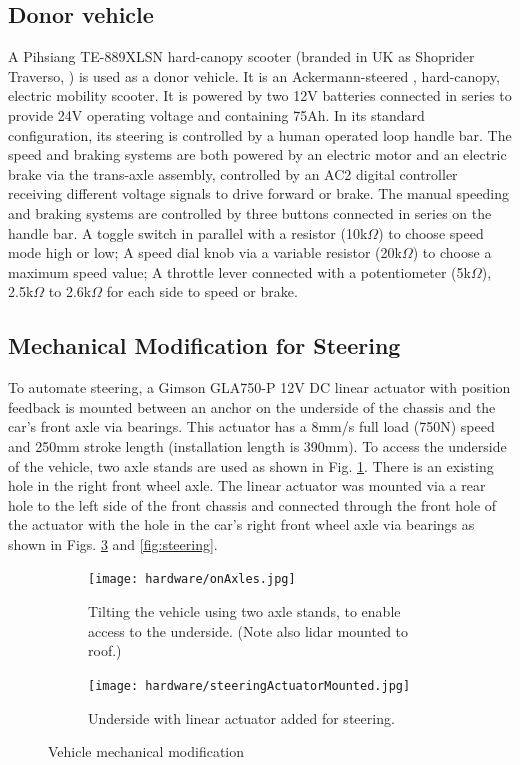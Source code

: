 \documentclass[a4paper]{article}
\begin{document}
	\subsection{Donor vehicle}
	
	A Pihsiang TE-889XLSN hard-canopy scooter (branded in UK as Shoprider Traverso, \cite{shoprider2016shoprider}) is used as a donor vehicle. It is an Ackermann-steered \cite{milliken1995race}, hard-canopy, electric mobility scooter. It is powered by two 12V batteries connected in series to provide 24V operating voltage and containing 75Ah. In its standard configuration, its steering is controlled by a human operated loop handle bar. The speed and braking systems are both powered by an electric motor and an electric brake via the trans-axle assembly, controlled by an AC2 digital controller receiving different voltage signals to drive forward or brake. The manual speeding and braking systems are controlled by three buttons connected in series on the handle bar. A toggle switch in parallel with a resistor (10k$\Omega$) to choose speed mode high or low; A speed dial knob via a variable resistor (20k$\Omega$) to choose a maximum speed value; A throttle lever connected with a potentiometer (5k$\Omega$), 2.5k$\Omega$ to 2.6k$\Omega$ for each side to speed or brake. 
	
	\subsection{Mechanical Modification for Steering}
	
	To automate steering, a Gimson GLA750-P 12V DC linear actuator with position feedback is mounted between an anchor on the underside of the chassis and the car's front axle via bearings.  This actuator has a 8mm/s full load (750N) speed and 250mm stroke length (installation length is 390mm). To access the underside of the vehicle, two axle stands are used as shown in Fig. \ref{fig:axelStands}. There is an existing hole in the right front wheel axle. The linear actuator was mounted via a rear hole to the left side of the front chassis and connected through the front hole of the actuator with the hole in the car's right front wheel axle via bearings as shown in Figs. \ref{fig:actuatorMounted} and \ref{fig:steering}.
	
	
	\begin{figure}
		\centering
		\begin{subfigure}{0.45\textwidth}
			\centering
			\texttt{[image: hardware/onAxles.jpg]}
			\caption{Tilting the vehicle using two axle stands, to enable access to the underside. (Note also lidar mounted to roof.)}
			\label{fig:axelStands}
		\end{subfigure}	
		\quad
		\begin{subfigure}{0.45\textwidth}
			\centering
			\texttt{[image: hardware/steeringActuatorMounted.jpg]}
			\caption{Underside with linear actuator added for steering.}
			\label{fig:actuatorMounted}
		\end{subfigure}
		\caption{Vehicle mechanical modification}
	\end{figure}
	
\end{document}
